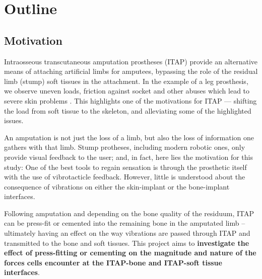 \section{Outline}




\subsection{Motivation}

Intraosseous transcutaneous amputation prostheses (ITAP) provide an alternative means of attaching artificial limbs for amputees, bypassing the role of the residual limb (stump) soft tissues in the attachment.
In the example of a leg prosthesis, we observe uneven loads, friction against socket and other abuses which lead to severe skin problems \citep{levy_skin_1980}.
This highlights one of the motivations for ITAP --- shifting the load from soft tissue to the skeleton, and alleviating some of the highlighted issues.

An amputation is not just the loss of a limb, but also the loss of information one gathers with that limb.
Stump protheses, including modern robotic ones, only provide visual feedback to the user; and, in fact, here lies the motivation for this study:
One of the best tools to regain sensation is through the prosthetic itself with the use of vibrotacticle feedback.
However, little is understood about the consequence of vibrations on either the skin-implant or the bone-implant interfaces.

Following amputation and depending on the bone quality of the residuum, ITAP can be press-fit or cemented into the remaining bone in the amputated limb – ultimately having an effect on the way vibrations are passed through ITAP and transmitted to the bone and soft tissues.
This project aims to \textbf{investigate the effect of press-fitting or cementing on the magnitude and nature of the forces cells encounter at the ITAP-bone and ITAP-soft tissue interfaces}.

